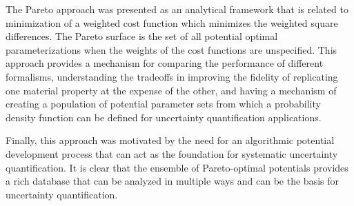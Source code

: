 The Pareto approach was presented as an analytical framework that is related to minimization of a weighted cost function which minimizes the weighted square differences. The Pareto surface is the set of all potential optimal parameterizations when the weights of the cost functions are unspecified. This approach provides a mechanism for comparing the performance of different formalisms, understanding the tradeoffs in improving the fidelity of replicating one material property at the expense of the other, and having a mechanism of creating a population of potential parameter sets from which a probability density function can be defined for uncertainty quantification applications.

Finally, this approach was motivated by the need for an algorithmic potential development process that can act as the foundation for systematic uncertainty quantification. It is clear that the ensemble of Pareto-optimal potentials provides a rich database that can be analyzed in multiple ways and can be the basis for uncertainty quantification.
